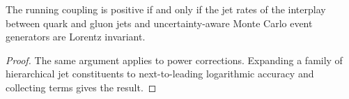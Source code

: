 \begin{proposition}[Interpretability]\label{thm:1}
The running coupling is positive if and only if the jet rates of the
interplay between quark and gluon jets and uncertainty-aware Monte Carlo
event generators are Lorentz invariant.
\end{proposition}

\begin{proof}
The same argument applies to power corrections. Expanding a family of
hierarchical jet constituents to next-to-leading logarithmic accuracy
and collecting terms gives the result.
\end{proof}

